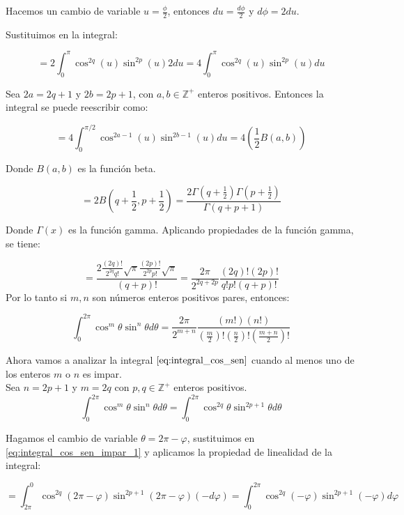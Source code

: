 Hacemos un cambio de variable $u=\frac{\phi}{2}$, entonces $du=\frac{d\phi}{2}$ y $d\phi=2du$.

Sustituimos en la integral:

\[
    =2\int_{0}^{\pi}\cos^{2q}\left(u\right)\sin^{2p}\left(u\right) 2du = 4\int_{0}^{\pi}\cos^{2q}\left(u\right)\sin^{2p}\left(u\right) du
\]

Sea $2a=2q+1$ y $2b=2p+1$, con $a,b\in\mathbb{Z}^+$ enteros positivos. Entonces la integral se puede reescribir como:

\[
    =4\int_{0}^{\pi/2}\cos^{2a-1}\left(u\right)\sin^{2b-1}\left(u\right) du = 4(\frac{1}{2}B(a,b))
\]

Donde $B(a,b)$ es la función beta.

\[
    =2B(q+\frac{1}{2},p+\frac{1}{2})=\frac{2\Gamma(q+\frac{1}{2})\Gamma(p+\frac{1}{2})}{\Gamma(q+p+1)}
\]

Donde $\Gamma(x)$ es la función gamma. Aplicando propiedades de la función gamma, se tiene:

\[
=\frac{2\frac{(2q)!}{2^{2q}q!}\sqrt{\pi}\frac{(2p)!}{2^{2p}p!}\sqrt{\pi}}{(q+p)!}=\frac{2\pi}{2^{2q+2p}}\frac{(2q)!(2p)!}{q!p!(q+p)!}
\]
Por lo tanto si $m,n$ son números enteros positivos pares, entonces:

\begin{equation}\label{eq: integral_cos_sen_pares}
    \int_{0}^{2\pi}\cos^m\theta\sin^n\theta d\theta = \frac{2\pi}{2^{m+n}}\frac{(m!)(n!)}{(\frac{m}{2})!(\frac{n}{2})!(\frac{m+n}{2})!}
\end{equation}

Ahora vamos a analizar la integral $\eqref{eq:integral_cos_sen}$ cuando al menos uno de los enteros $m$ o $n$ es impar.\\

Sea $n=2p+1$ y $m=2q$ con $p,q\in\mathbb{Z}^+$ enteros positivos.\\

\begin{equation}\label{eq:integral_cos_sen_impar_1}
    \int_{0}^{2\pi}\cos^m\theta\sin^n\theta d\theta=\int_{0}^{2\pi}\cos^{2q}\theta\sin^{2p+1}\theta d\theta
\end{equation}

Hagamos el cambio de variable $\theta=2\pi-\varphi$, sustituimos en \eqref{eq:integral_cos_sen_impar_1} y aplicamos la propiedad de linealidad de la integral:

\[
    =\int_{2\pi}^{0}\cos^{2q}(2\pi-\varphi)\sin^{2p+1}(2\pi-\varphi)(-d\varphi)=\int_{0}^{2\pi}\cos^{2q}(-\varphi)\sin^{2p+1}(-\varphi) d\varphi
\]

